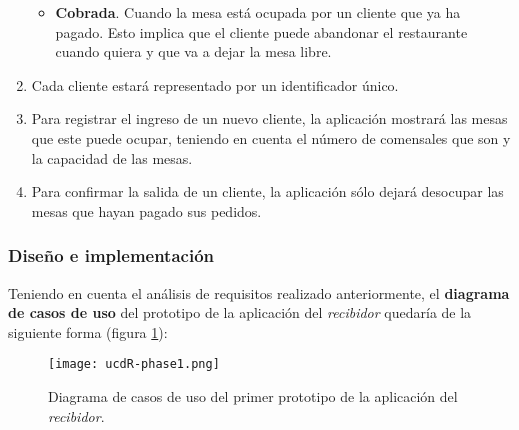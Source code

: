 \begin{enumerate}
\begin{itemize}
  \item \textbf{Cobrada}. Cuando la mesa está ocupada por un cliente que ya
  ha pagado. Esto implica que el cliente puede abandonar el restaurante
  cuando quiera y que va a dejar la mesa libre.
  \end{itemize}
\item Cada cliente estará representado por un identificador único.
\item Para registrar el ingreso de un nuevo cliente, la aplicación mostrará
las mesas que este puede ocupar, teniendo en cuenta el número de comensales que
son y la capacidad de las mesas.
\item Para confirmar la salida de un cliente, la aplicación sólo dejará
desocupar las mesas que hayan pagado sus pedidos.
\end{enumerate}

\subsubsection{Diseño e implementación}
Teniendo en cuenta el análisis de requisitos realizado anteriormente, el
\textbf{diagrama de casos de uso} del prototipo de la aplicación del
\emph{recibidor} quedaría de la siguiente forma (figura \ref{fig:ucdR-phase1}):

  \begin{figure}[!h]
    \begin{center}
      \texttt{[image: ucdR-phase1.png]}
      \caption{Diagrama de casos de uso del primer prototipo de la aplicación
      del \emph{recibidor}.}
      \label{fig:ucdR-phase1}
    \end{center}
  \end{figure}

